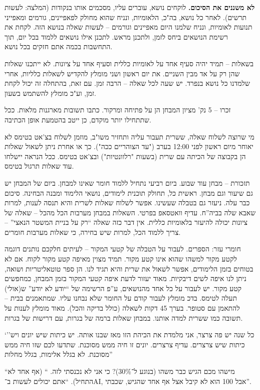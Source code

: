 \documentclass[a4paper]{book}
\begin{document}
	\textbf{לא משננים את הסיכום. }לוקחים נושא, עוברים עליו, מסכמים אותו בנקודות (המלצה: לעשות תרשים). לאחר כל נושא, בה"כ, הלאומיות, ונניח שהוא מחולק לפאפיינים, גורמים ומאפייני תנועות לאומיות, ונניח שלמנו היום מאפיינים וגורמים – לעשות שאלה בנושא הזה. לקחת את רשימת הנושאים ביחס לזמן, ולתכנן מראש. לתכנן אילו נושאים ללמוד בכל יום, תוך התחשבות בכמה אתם חזקים בכל נושא. 
	
	בשאלות – תמיד יהיה סעיף אחד על לאומיות כללית וסעיף אחד על ציונות. לא ייתכנו שאלות שהן רק על אד מבין השניים. את יום ראשון ושני מומלץ להקדיש לשאלות כלליות, אחרי שלמדנו כל נושא בנפרד. יש שעה לכל שאלה – הרבה זמן. עם זאת, בהתחלה זה יכול לקחת זמן, וע"כ מומלץ להשתמש בשעון. 
	
	זכרו – 5 נק' מציון המבחן הן על פתיחה ומרקור. כתבו תשובות מארגנות מלאות. ככל שתתחילו יותר מוקדם, כן ייטב בהטמעת אופן הכתיבה. 
	
	מי שרוצה לשלוח שאלה, ששרית תעבור עליה ותחזיר משו"ב, מוזמן לשלוח בצ'אט בטימס לא יאוחר מיום ראשון לפני 12:00 בערב ("עד הצוהריים ככה"). כך או אחרת ניתן לשאול שאלות הן בקבוצה של הכיתה עם שרית (בשעות "רלוונטיות") ובצ'אט בטימס. ככל הנראה יישלחו עוד שאלות תרגול בטימס. 
	
	תזכורת – מבחן עוד שבוע. ביום רביעי נתחיל ללמוד חומר שאינו למבחן. ביום של המבחן יש גם שיעור וגם מבחן. ראשית כל, תחולק תוכנית לימודים, נושאי הלימוד ומבנה הבחינה. סיכום כבר עלה. ניעזר גם בטבלה שעשינו. אפשר לשלוח שאלות לשרית והיא תנסה לענות, למרות שאבא שלה בביה''ח. עדיף וואטסאפ בפרטי. השאלות במבחן מערבות הכל מהכל – שאלה של ציונות יכולה להיעזר בלאומיות כללית. אין דבר כזה שאלה ``רק על בניית המשטר הנאצי'' – צריך ללמוד הכל, למרות שיש בחירה, כי שאלות מערבות חומרים. 
	
	חומרי עזר: הספרים. לעבור על הטבלה של קטעי המקור – לעיתים חלקכם נותנים דוגמה לקטע מקור למשהו שהוא אינו קטע מקור. תמיד מצוין מאיפה קטע מקור לקוח. אם לא בטוחים בזמן הלימודים, אפשר לשאול את שרית והיא תגיד לנו. הן ספר טוטאליטריות ושואה, ניתן לנו איפה לשים דיבקיות. מאוד יעזור לדעת איפה קטעי המקור בזמן המבחן, כמחפשים קטע מקור. יש לעבור על כל אחד מהנושאים, ע''פ הרשימה של ``יודע לא יודע'' ש(אולי) תעלה לטימס. בדכ מומלץ לעבור קודם על החומר שלא נבחנו עליו. שמתאמנים בבית – להתאמן עם סטופר. בערך 45 דקות לשאלה (כולל בדיקה והכל). מאוד מומלץ לענות על תשובה כמו ששרית למדה אותנו. במבחן שאלות ברמה של בגרות, עם דרישות של בגרות. 
	
	
	`''כל שנה יש פה צרצר, אני מלמדת את הכיהת הזו מאז שבנו אותה. יש כיתות שיש יונים ויש כיתות שיש צרצרים. עדיף צרצרים. יונים זו חיה ממש מסוכנת. שתדעו לכם שזו חיה ממש מסוכנת. לא בגלל אלימות, בגלל מחלות''
	
	``מישהו מכם הגיש כבר משהו (בנוגע ל־30\%)? כי אני לא נכנסתי לזה. `` (אף אחד לא התחיל). ``אתם יכולים לעשות ב־AI, אבל 100 הוא לא קיבל אצל אף אחד שהגיש, שכבתי''. 
	
\end{document}
